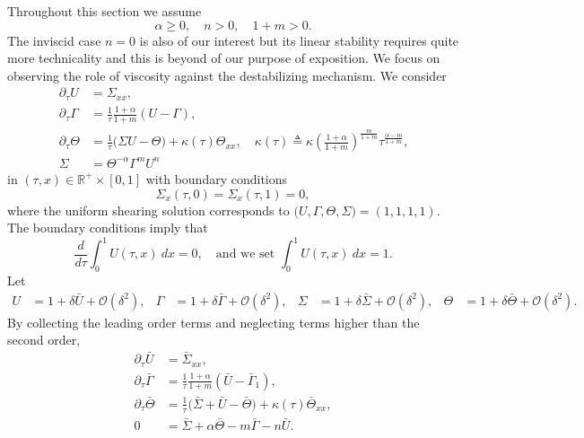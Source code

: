 \documentclass[a4paper,11pt]{article}
\theoremstyle{remark}
\begin{document}
Throughout this section we assume
\begin{equation} \alpha\ge0, \quad n>0, \quad 1+m>0. \label{eq:range} \end{equation}
The inviscid case $n=0$ is also of our interest but its linear stability requires quite more technicality and this is beyond of our purpose of exposition. We focus on  observing the role of viscosity against the destabilizing mechanism. 
We consider
\begin{equation} \label{eq:system}
 \begin{aligned}
  \partial_\tau U &= \Sigma_{xx},\\
  \partial_\tau\Gamma &= \frac{1}{\tau}\frac{1+\alpha}{1+m}(U-\Gamma),\\
  \partial_\tau\Theta &= \frac{1}{\tau}\Big(\Sigma U -\Theta\Big) + \kappa(\tau)\Theta_{xx}, \quad \text{$\kappa(\tau)\triangleq\kappa\left(\frac{1+\alpha}{1+m}\right)^{\frac{m}{1+m}}\tau^{\frac{\alpha-m}{1+m}}$,}\\
  \Sigma &= \Theta^{-\alpha}\Gamma^m U^n
 \end{aligned}
\end{equation}
in $(\tau,x)\in \mathbb{R}^+\times [0,1]$ with boundary conditions
\begin{equation}
 \Sigma_x(\tau,0)=\Sigma_x(\tau,1)=0,
\end{equation}
where the uniform shearing solution corresponds to $\big(U, \Gamma, \Theta, \Sigma\big) = (1,1,1,1)$.
The boundary conditions imply that
\begin{equation*} 
 \frac{d}{d\tau}\int_0^1 U(\tau,x) \: dx = 0, \quad \text{and we set } \int_0^1 U(\tau,x) \: dx = 1.
\end{equation*}
Let
\begin{align*}
 U &= 1 + \delta \bar{U} + \mathcal{O}(\delta^2), & \Gamma &= 1 + \delta \bar\Gamma + \mathcal{O}(\delta^2), &
 \Sigma &= 1 + \delta \bar\Sigma + \mathcal{O}(\delta^2), & \Theta &= 1 + \delta \bar\Theta + \mathcal{O}(\delta^2).
\end{align*}
By collecting the leading order terms and neglecting terms higher than the  second order,
\begin{equation} \label{eq:linsystem}
 \begin{aligned}
  \partial_\tau \bar U &= \bar\Sigma_{xx},\\
  \partial_\tau \bar\Gamma &= \frac{1}{\tau}\frac{1+\alpha}{1+m}(\bar U-\bar\Gamma_1),\\
  \partial_\tau \bar\Theta &= \frac{1}{\tau}\Big(\bar\Sigma+ \bar U -\bar\Theta\Big) + \kappa(\tau)\bar\Theta_{xx},\\
  0&=\bar\Sigma + \alpha\bar\Theta -m\bar\Gamma - n\bar U .
 \end{aligned}
\end{equation}
\end{document}
